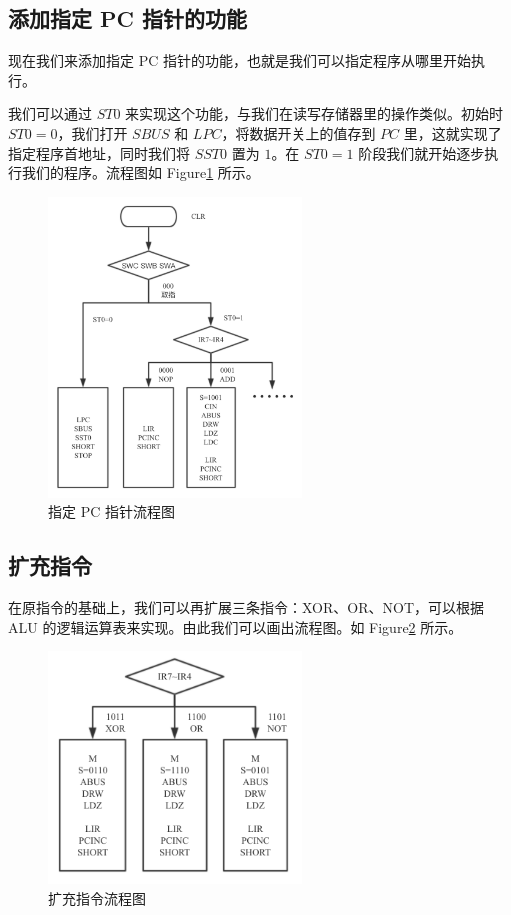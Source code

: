 \documentclass[12pt]{article}
\begin{document}
{    \subsection{添加指定 PC 指针的功能}
        现在我们来添加指定 PC 指针的功能，也就是我们可以指定程序从哪里开始执行。
        
        我们可以通过 $ST0$ 来实现这个功能，与我们在读写存储器里的操作类似。初始时 $ST0=0$，我们打开 $SBUS$ 和 $LPC$，将数据开关上的值存到 $PC$ 里，这就实现了指定程序首地址，同时我们将 $SST0$ 置为 $1$。在 $ST0=1$ 阶段我们就开始逐步执行我们的程序。流程图如 Figure\ref{fig:5-2} 所示。
        
        \begin{figure}[!ht]
            \centering
            \includegraphics[width=0.6\textwidth]{PC指针.png}
            \caption{指定 PC 指针流程图}
            \label{fig:5-2}
        \end{figure}
        
    \subsection{扩充指令}
        在原指令的基础上，我们可以再扩展三条指令：XOR、OR、NOT，可以根据 ALU 的逻辑运算表来实现。由此我们可以画出流程图。如 Figure\ref{fig:5-3} 所示。
        
        \begin{figure}[!ht]
            \centering
            \includegraphics[width=0.6\textwidth]{扩指.png}
            \caption{扩充指令流程图}
            \label{fig:5-3}
        \end{figure}
        

}
\end{document}

